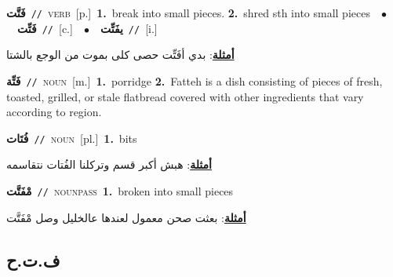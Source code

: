 \documentclass[10pt,a4paper,twoside]{article} %
\begin{document}
\begin{multicols}{2}
{\setlength\topsep{0pt}\textbf{\foreignlanguage{arabic}{فَتَّت}}\ {\color{gray}\texttt{//}\color{black}}\ \textsc{verb}\ [p.]\ \textbf{1.}~break into small pieces.  \textbf{2.}~shred sth into small pieces\ \ $\bullet$\ \ \setlength\topsep{0pt}\textbf{\foreignlanguage{arabic}{فَتِّت}}\ {\color{gray}\texttt{//}\color{black}}\ [c.]\ \ $\bullet$\ \ \setlength\topsep{0pt}\textbf{\foreignlanguage{arabic}{يفَتِّت}}\ {\color{gray}\texttt{//}\color{black}}\ [i.]\  \begin{flushright}\color{gray}\foreignlanguage{arabic}{\textbf{\underline{\foreignlanguage{arabic}{أمثلة}}}: بدي أفَتِّت حصى كلى بموت من الوجع بالشتا}\end{flushright}\color{black}} \vspace{2mm}

{\setlength\topsep{0pt}\textbf{\foreignlanguage{arabic}{فَتِّة}}\ {\color{gray}\texttt{//}\color{black}}\ \textsc{noun}\ [m.]\ \textbf{1.}~porridge  \textbf{2.}~Fatteh is a dish consisting of pieces of fresh, toasted, grilled, or stale flatbread covered with other ingredients that vary according to region.\ } \vspace{2mm}

{\setlength\topsep{0pt}\textbf{\foreignlanguage{arabic}{فُتَات}}\ {\color{gray}\texttt{//}\color{black}}\ \textsc{noun}\ [pl.]\ \textbf{1.}~bits\  \begin{flushright}\color{gray}\foreignlanguage{arabic}{\textbf{\underline{\foreignlanguage{arabic}{أمثلة}}}: هبش أكبر قسم وتركلنا الفُتات نتقاسمه}\end{flushright}\color{black}} \vspace{2mm}

{\setlength\topsep{0pt}\textbf{\foreignlanguage{arabic}{مْفَتَّت}}\ {\color{gray}\texttt{//}\color{black}}\ \textsc{noun\textunderscore pass}\ \textbf{1.}~broken into small pieces\  \begin{flushright}\color{gray}\foreignlanguage{arabic}{\textbf{\underline{\foreignlanguage{arabic}{أمثلة}}}: بعثت صحن معمول لعندها عالخليل وصل مْفَتَّت}\end{flushright}\color{black}} \vspace{2mm}

\vspace{-3mm}
\subsection*{\color{blue}\foreignlanguage{arabic}{ف.ت.ح}\color{blue}{}} 


\end{multicols}
\end{document}
